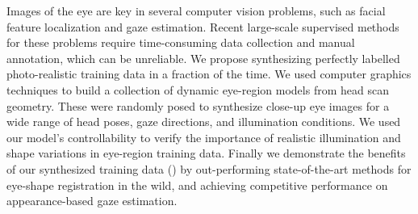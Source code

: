 Images of the eye are key in several computer vision problems, such as facial feature localization and gaze estimation.
Recent large-scale supervised methods for these problems require time-consuming data collection and manual annotation, which can be unreliable.
We propose synthesizing perfectly labelled photo-realistic training data in a fraction of the time.
We used computer graphics techniques to build a collection of dynamic eye-region models from head scan geometry.
%
These were randomly posed to synthesize close-up eye images for a wide range of head poses, gaze directions, and illumination conditions.
%
We used our model's controllability to verify the importance of realistic illumination and shape variations in eye-region training data.
%
Finally we demonstrate the benefits of our synthesized training data (\dataset) by out-performing state-of-the-art methods for eye-shape registration in the wild, and achieving competitive performance on appearance-based gaze estimation.
